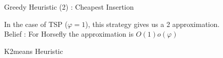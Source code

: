 \documentclass{beamer}
\begin{document}
\begin{frame}{Greedy Heuristic (2) : Cheapest Insertion }
\begin{figure}[H]
    
     \end{figure}
  \begin{center}

     {\color{byzantine}In the case of TSP ($\varphi=1$), this strategy gives us a 2 approximation. \\

              Belief : For Horsefly the approximation is $ O(1) o(\varphi)$} \normalsize
  \end{center}
\end{frame}

\begin{frame}{K2means Heuristic}
   \begin{figure}[H]
    \centering
  \end{figure}
\end{frame}
\end{document}
